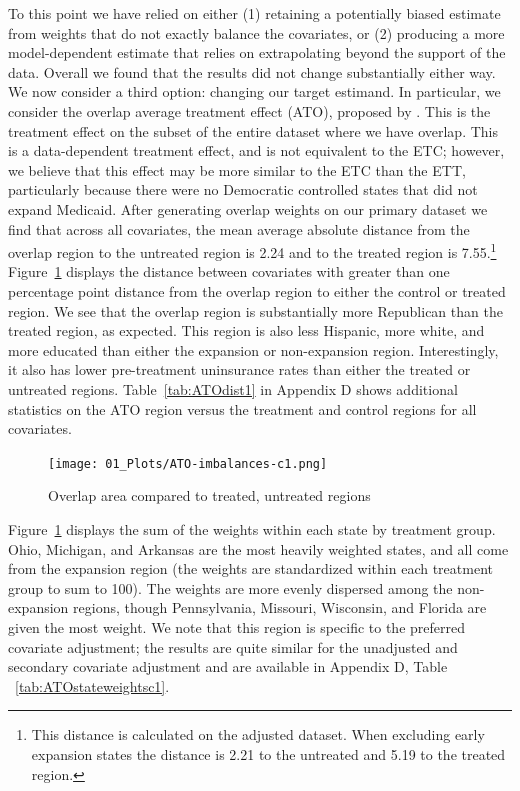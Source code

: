 \documentclass[aoas]{imsart}
\theoremstyle{plain}
\theoremstyle{remark}
\begin{document}
To this point we have relied on either (1) retaining a potentially biased estimate from weights that do not exactly balance the covariates, or (2) producing a more model-dependent estimate that relies on extrapolating beyond the support of the data. Overall we found that the results did not change substantially either way. We now consider a third option: changing our target estimand. In particular, we consider the overlap average treatment effect (ATO), proposed by \cite{li2018balancing}. This is the treatment effect on the subset of the entire dataset where we have overlap. This is a data-dependent treatment effect, and is not equivalent to the ETC; however, we believe that this effect may be more similar to the ETC than the ETT, particularly because there were no Democratic controlled states that did not expand Medicaid. After generating overlap weights on our primary dataset we find that across all covariates, the mean average absolute distance from the overlap region to the untreated region is 2.24 and to the treated region is 7.55.\footnote{This distance is calculated on the adjusted dataset. When excluding early expansion states the distance is 2.21 to the untreated and 5.19 to the treated region.} Figure~\ref{fig:ATOimbalance} displays the distance between covariates with greater than one percentage point distance from the overlap region to either the control or treated region. We see that the overlap region is substantially more Republican than the treated region, as expected. This region is also less Hispanic, more white, and more educated than either the expansion or non-expansion region. Interestingly, it also has lower pre-treatment uninsurance rates than either the treated or untreated regions. Table~\ref{tab:ATOdist1} in Appendix D shows additional statistics on the ATO region versus the treatment and control regions for all covariates.

\begin{figure}[H]
\begin{center}
    \caption{Overlap area compared to treated, untreated regions}
    \label{fig:ATOimbalance}
    \texttt{[image: 01\_Plots/ATO-imbalances-c1.png]}
\end{center}
\end{figure}

Figure~\ref{fig:ATOimbalance} displays the sum of the weights within each state by treatment group. Ohio, Michigan, and Arkansas are the most heavily weighted states, and all come from the expansion region (the weights are standardized within each treatment group to sum to 100). The weights are more evenly dispersed among the non-expansion regions, though Pennsylvania, Missouri, Wisconsin, and Florida are given the most weight. We note that this region is specific to the preferred covariate adjustment; the results are quite similar for the unadjusted and secondary covariate adjustment and are available in Appendix D, Table ~\ref{tab:ATOstateweightsc1}.
\end{document}
